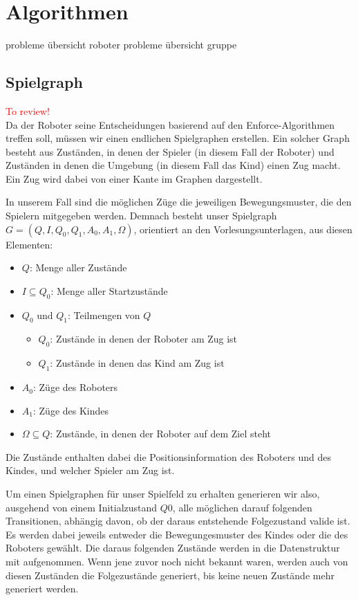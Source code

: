 \section{Algorithmen}
probleme übersicht roboter
probleme übersicht gruppe
\subsection{Spielgraph}
\textcolor{red}{To review!}\\
Da der Roboter seine Entscheidungen basierend auf den Enforce-Algorithmen treffen soll, müssen wir einen endlichen
Spielgraphen erstellen. Ein solcher Graph besteht aus Zuständen, in denen der Spieler (in diesem Fall der Roboter)
und Zuständen in denen die Umgebung (in diesem Fall das Kind) einen Zug macht. Ein Zug wird dabei von einer Kante im Graphen
dargestellt.\par

In unserem Fall sind die möglichen Züge die jeweiligen Bewegungsmuster, die den Spielern mitgegeben werden.
Demnach besteht unser Spielgraph $G = (Q, I, Q_0, Q_1, A_0, A_1, \Omega)$, orientiert an den Vorlesungsunterlagen, aus diesen Elementen:
\begin{itemize}
	\item $Q$: Menge aller Zustände
	\item $I \subseteq Q_0$: Menge aller Startzustände
	\item $Q_0  \text{ und }  Q_1$: Teilmengen von $Q$
	\begin{itemize}
		\item $Q_0$: Zustände in denen der Roboter am Zug ist
		\item $Q_1$: Zustände in denen das Kind am Zug ist
	\end{itemize}
	\item $A_0$: Züge des Roboters
	\item $A_1$: Züge des Kindes
	\item $\Omega \subseteq Q$: Zustände, in denen der Roboter auf dem Ziel steht
\end{itemize}

Die Zustände enthalten dabei die Positionsinformation des Roboters und des Kindes, und welcher Spieler am Zug ist.

Um einen Spielgraphen für unser Spielfeld zu erhalten generieren wir also, ausgehend von einem Initialzustand $Q0$, alle möglichen darauf folgenden Transitionen, abhängig davon, ob der daraus entstehende Folgezustand valide ist. Es werden dabei jeweils entweder die Bewegungesmuster des Kindes oder die des Roboters gewählt. Die daraus folgenden Zustände werden in die Datenstruktur mit aufgenommen. Wenn jene zuvor noch nicht bekannt waren, werden auch von diesen Zuständen die Folgezustände generiert, bis keine neuen Zustände mehr generiert werden. 

